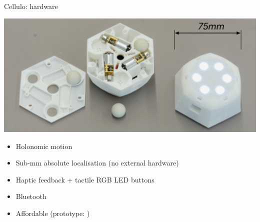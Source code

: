 \documentclass[compress]{beamer}
\begin{document}
 \begin{frame}{Cellulo: hardware}
     \begin{center}
         \includegraphics[width=0.8\linewidth]{cellulo/hardware-design}
     \end{center}
     \begin{itemize}
         \item Holonomic motion
         \item Sub-mm absolute localisation (no external hardware)
         \item Haptic feedback + tactile RGB LED buttons 
         \item Bluetooth
         \item<2> Affordable (prototype: )
     \end{itemize}
 \end{frame}







%
%
\end{document}
